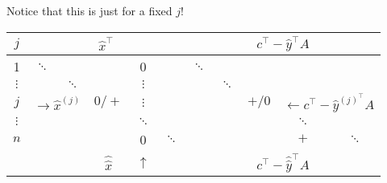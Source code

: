\begin{explanation}
	Notice that this is just for a fixed \(j\)!
	\begin{table}[H]
		\centering
		\begin{tabular}{c|ccccc|ccccc}
			\toprule
			\(j\)      & \multicolumn{5}{c|}{\(\hat{x}^{\top}\)}   & \multicolumn{5}{c}{\(c^{\top} - \hat{y}^{\top}A\)}                                                                                                                                                                                                                                    \\
			\midrule
			1          & \(\ddots\)                                &                                                    &                   & 0            &            & \(\ddots\)                                             &            &                                                                                  &            &            \\
			\(\vdots\) &                                           & \(\ddots\)                                         &                   & \(\vdots\)   &            &                                                        & \(\ddots\) &                                                                                  &            &            \\
			\(j\)      & \multicolumn{2}{c}{\(\to \hat{x}^{(j)}\)} & \(0/+\)                                            & \(\vdots\)        &              &            &                                                        & \(+/0\)    & \multicolumn{2}{c}{\footnotesize{\(\leftarrow c^{\top}-\hat{y}^{(j)^{\top}}A\)}}                           \\
			\(\vdots\) &                                           &                                                    &                   & \(\ddots\)   &            &                                                        &            &                                                                                  & \(\ddots\) &            \\
			\(n\)      &                                           &                                                    &                   & 0            & \(\ddots\) &                                                        &            &                                                                                  & \(+\)      & \(\ddots\) \\
			\hline
			           &                                           &                                                    & \(\hat{\hat{x}}\) & \(\uparrow\) &            & \multicolumn{5}{c}{\(c^{\top}-\hat{\hat{y}}^{\top}A\)}                                                                                                                           \\

\end{tabular}
\end{table}
\end{explanation}
